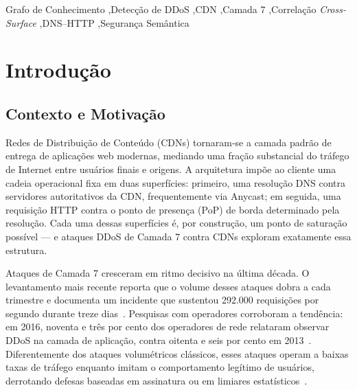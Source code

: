 \documentclass[preprint,12pt]{elsarticle}
\begin{document}
\begin{frontmatter}
\begin{abstract}
\end{abstract}

\begin{keyword}
Grafo de Conhecimento \sep Detecção de DDoS \sep CDN \sep Camada 7 \sep Correlação \emph{Cross-Surface} \sep DNS--HTTP \sep Segurança Semântica
\end{keyword}

\end{frontmatter}


\section{Introdução}
\label{sec:introduction}

\subsection{Contexto e Motivação}

Redes de Distribuição de Conteúdo (CDNs) tornaram-se a camada padrão de entrega de aplicações web modernas, mediando uma fração substancial do tráfego de Internet entre usuários finais e origens. A arquitetura impõe ao cliente uma cadeia operacional fixa em duas superfícies: primeiro, uma resolução DNS contra servidores autoritativos da CDN, frequentemente via Anycast; em seguida, uma requisição HTTP contra o ponto de presença (PoP) de borda determinado pela resolução. Cada uma dessas superfícies é, por construção, um ponto de saturação possível --- e ataques DDoS de Camada 7 contra CDNs exploram exatamente essa estrutura.

Ataques de Camada 7 cresceram em ritmo decisivo na última década. O levantamento mais recente reporta que o volume desses ataques dobra a cada trimestre e documenta um incidente que sustentou 292.000 requisições por segundo durante treze dias~\cite{tripathi2021application}. Pesquisas com operadores corroboram a tendência: em 2016, noventa e três por cento dos operadores de rede relataram observar DDoS na camada de aplicação, contra oitenta e seis por cento em 2013~\cite{odusami2020survey}. Diferentemente dos ataques volumétricos clássicos, esses ataques operam a baixas taxas de tráfego enquanto imitam o comportamento legítimo de usuários, derrotando defesas baseadas em assinatura ou em limiares estatísticos~\cite{kemp2023approach,fernandes2015autonomous,bharathi2012pca}.
\end{document}
